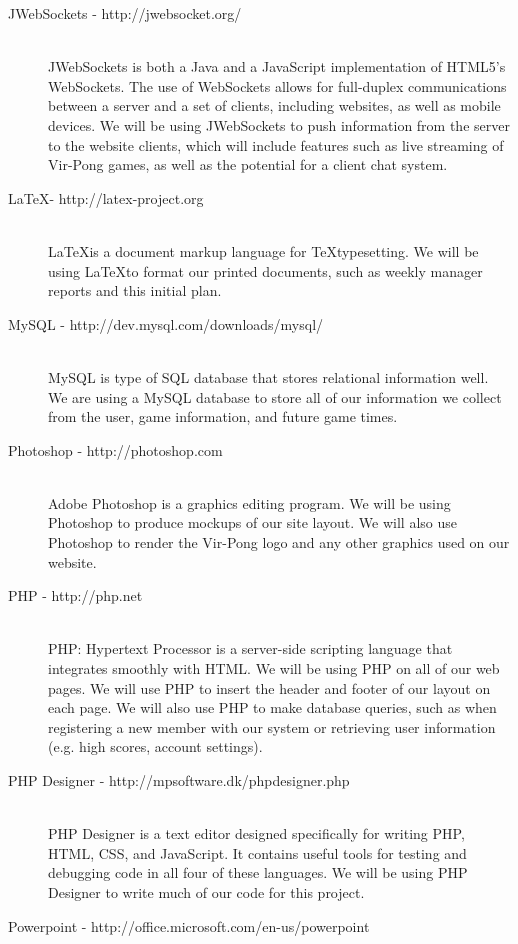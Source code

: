 \begin{description}
		\item[JWebSockets - http://jwebsocket.org/] \hfill \\
			JWebSockets is both a Java and a JavaScript implementation of HTML5's WebSockets. The use of WebSockets allows for full-duplex communications between a server and a set of clients, including websites, as well as mobile devices. We will be using JWebSockets to push information from the server to the website clients, which will include features such as live streaming of Vir-Pong games, as well as the potential for a client chat system.
		\item[\LaTeX - http://latex-project.org] \hfill \\
			\LaTeX is a document markup language for \TeX typesetting. We will be using \LaTeX to format our printed documents, such as weekly manager reports and this initial plan.
		\item[MySQL -  http://dev.mysql.com/downloads/mysql/] \hfill \\
			MySQL is  type of SQL database that stores relational information well. We are using a MySQL database to store all of our information we collect from the user, game information, and future game times.
		\item[Photoshop - http://photoshop.com] \hfill \\
			Adobe Photoshop is a graphics editing program. We will be using Photoshop to produce mockups of our site layout. We will also use Photoshop to render the Vir-Pong logo and any other graphics used on our website.
		\item[PHP - http://php.net] \hfill \\
			PHP: Hypertext Processor is a server-side scripting language that integrates smoothly with HTML. We will be using PHP on all of our web pages. We will use PHP to insert the header and footer of our layout on each page. We will also use PHP to make database queries, such as when registering a new member with our system or retrieving user information (e.g. high scores, account settings).
		\item[PHP Designer - http://mpsoftware.dk/phpdesigner.php] \hfill \\
			PHP Designer is a text editor designed specifically for writing PHP, HTML, CSS, and JavaScript. It contains useful tools for testing and debugging code in all four of these languages. We will be using PHP Designer to write much of our code for this project.
		\item[Powerpoint - http://office.microsoft.com/en-us/powerpoint] \hfill \\

\end{description}
